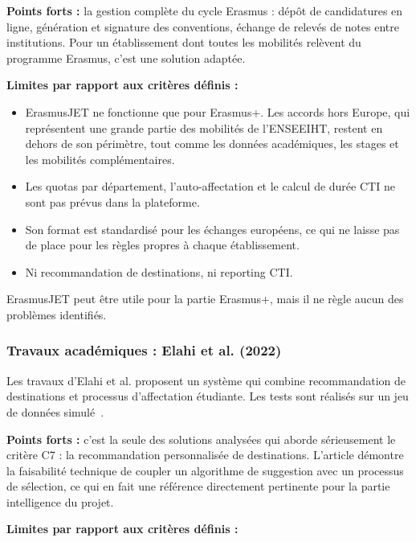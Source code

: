 \textbf{Points forts :} la gestion complète du cycle Erasmus : dépôt de candidatures en ligne, génération et signature des conventions, échange de relevés de notes entre institutions. Pour un établissement dont toutes les mobilités relèvent du programme Erasmus, c'est une solution adaptée.

\textbf{Limites par rapport aux critères définis :}

\begin{itemize}
    \item ErasmusJET ne fonctionne que pour Erasmus+. Les accords hors Europe, qui représentent une grande partie des mobilités de l'ENSEEIHT, restent en dehors de son périmètre, tout comme les données académiques, les stages et les mobilités complémentaires.

    \item Les quotas par département, l'auto-affectation et le calcul de durée CTI ne sont pas prévus dans la plateforme.

    \item Son format est standardisé pour les échanges européens, ce qui ne laisse pas de place pour les règles propres à chaque établissement.

    \item Ni recommandation de destinations, ni reporting CTI.
\end{itemize}

ErasmusJET peut être utile pour la partie Erasmus+, mais il ne règle aucun des problèmes identifiés.

\subsubsection{Travaux académiques : Elahi et al. (2022)}

Les travaux d'Elahi et al. proposent un système qui combine recommandation de destinations et processus d'affectation étudiante. Les tests sont réalisés sur un jeu de données simulé~\cite{Elahi2022}.

\textbf{Points forts :} c'est la seule des solutions analysées qui aborde sérieusement le critère C7 : la recommandation personnalisée de destinations. L'article démontre la faisabilité technique de coupler un algorithme de suggestion avec un processus de sélection, ce qui en fait une référence directement pertinente pour la partie intelligence du projet.

\textbf{Limites par rapport aux critères définis :}

